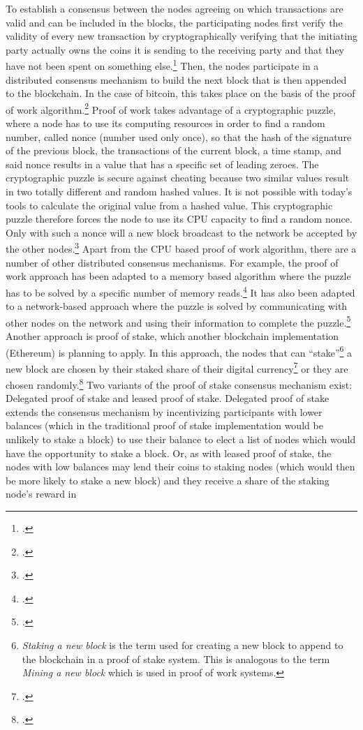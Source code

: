 To establish a consensus between the nodes agreeing on which transactions are valid and can be included in the blocks, the participating nodes first verify the validity of every new transaction by cryptographically verifying that the initiating party actually owns the coins it is sending to the receiving party and that they have not been spent on something else.\footcite[cf.][p.68]{AntonopolousAndreasM..2017} Then, the nodes participate in a distributed consensus mechanism to build the next block that is then appended to the blockchain. In the case of bitcoin, this takes place on the basis of the proof of work algorithm.\footcites[Cf.][]{Dwork.1993}[cf.][p.3]{Nakamoto.2008} Proof of work takes advantage of a cryptographic puzzle, where a node has to use its computing resources in order to find a random number, called nonce (number used only once), so that the hash of the signature of the previous block, the transactions of the current block, a time stamp, and said nonce results in a value that has a specific set of leading zeroes. The cryptographic puzzle is secure against cheating because two similar values result in two totally different and random hashed values. It is not possible with today's tools to calculate the original value from a hashed value. This cryptographic puzzle therefore forces the node to use its CPU capacity to find a random nonce. Only with such a nonce will a new block broadcast to the network be accepted by the other nodes.\footcites[Cf.][p.8]{Nakamoto.2008}[cf.][p.12]{Schutte.2017} Apart from the CPU based proof of work algorithm, there are a number of other distributed consensus mechanisms. For example, the proof of work approach has been adapted to a memory based algorithm where the puzzle has to be solved by a specific number of memory reads.\footcite[Cf.][]{Abadi.2005} It has also been adapted to a network-based approach where the puzzle is solved by communicating with other nodes on the network and using their information to complete the puzzle.\footcite[Cf.][]{Abliz.2009} Another approach is proof of stake, which another blockchain implementation (Ethereum) is planning to apply. In this approach, the nodes that can \enquote{stake}\footnote{\textit{Staking a  new block} is the term used for creating a new block to append to the blockchain in a proof of stake system. This is analogous to the term \textit{Mining a new block} which is used in proof of work systems.} a new block are chosen by their staked share of their digital currency\footcite[Cf.][]{King.2012} or they are chosen randomly.\footcites[Cf.][]{w.A..2016}[cf.][p.200]{AntonopolousAndreasM..2017}[cf.][p.11-12]{Schlatt.2016} Two variants of the proof of stake consensus mechanism exist: Delegated proof of stake and leased proof of stake. Delegated proof of stake extends the consensus mechanism by incentivizing participants with lower balances (which in the traditional proof of stake implementation would be unlikely to stake a block) to use their balance to elect a list of nodes which would have the opportunity to stake a block. Or, as with leased proof of stake, the nodes with low balances may lend their coins to staking nodes (which would then be more likely to stake a new block) and they receive a share of the staking node's reward in 